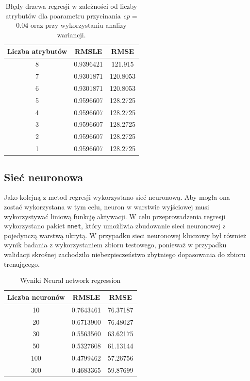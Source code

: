 \documentclass[a4paper,12pt]{article}
\begin{document}
        \begin{table}
            \begin{tabular}{|c|c|c|}
                \hline
                Liczba atrybutów & RMSLE & RMSE \\
                \hline
                8 & 0.9396421 & 121.915 \\
                \hline
                7 & 0.9301871 & 120.8053 \\
                \hline
                6 & 0.9301871 & 120.8053 \\
                \hline
                5 & 0.9596607 & 128.2725 \\
                \hline
                4 & 0.9596607 & 128.2725 \\
                \hline
                3 & 0.9596607 & 128.2725 \\
                \hline
                2 & 0.9596607 & 128.2725 \\
                \hline
                1 & 0.9596607 & 128.2725 \\
                \hline
            \end{tabular}
            \caption{Błędy drzewa regresji w zależności od liczby atrybutów dla poarametru przycinania \textit{cp} = 0.04 oraz przy wykorzystaniu analizy wariancji.}
            \label{tab:regtree2}
        \end{table}
    
    \subsection{Sieć neuronowa}

    Jako kolejną z metod regresji wykorzystano sieć neuronową. Aby mogła ona zostać wykorzystana w tym celu, neuron w warstwie wyjściowej musi wykorzystywać
    liniową funkcję aktywacji. W celu przeprowadzenia regresji wykorzystano pakiet \texttt{nnet}, który umożliwia zbudowanie sieci neuronowej z pojedynczą
    warstwą ukrytą. W przypadku sieci neuronowej kluczowy był również wynik badania z wykorzystaniem zbioru testowego, ponieważ w przypadku walidacji
    skrośnej zachodziło niebezpieczeństwo zbytniego dopasowania do zbioru trenującego.
        \begin{table}
            \begin{tabular}{|c|c|c|}
            \hline 
            Liczba neuronów & RMSLE & RMSE \\ 
            \hline 
            10 & 0.7643461 & 76.37187 \\ 
            \hline 
            20 & 0.6713900 & 76.48027 \\ 
            \hline 
            30 & 0.5563560 & 63.62175 \\ 
            \hline 
            50 & 0.5327608 & 61.13144 \\ 
            \hline 
            100 & 0.4799462 & 57.26756 \\ 
            \hline 
            300 & 0.4683365 & 59.87699 \\ 
            \hline 
            \end{tabular} 
            \caption{Wyniki Neural network regression}
        \end{table}
        
\end{document}
